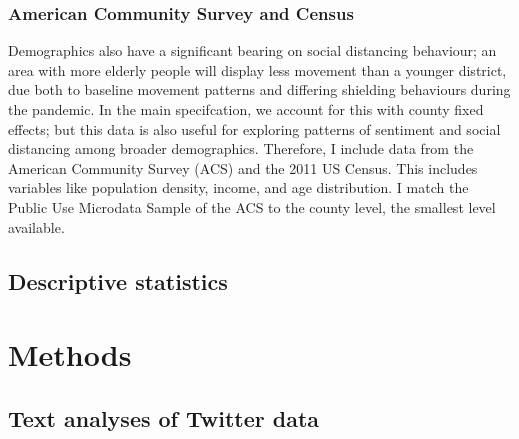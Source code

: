 \documentclass{article}
\begin{document}
\subsubsection{American Community Survey and Census}
Demographics also have a significant bearing on social distancing behaviour; an area with more elderly people will display less movement than a younger district, due both to baseline movement patterns and differing shielding behaviours during the pandemic. In the main specifcation, we account for this with county fixed effects; but this data is also useful for exploring patterns of sentiment and social distancing among broader demographics. Therefore, I include data from the American Community Survey (ACS) and the 2011 US Census. This includes variables like population density, income, and age distribution. I match the Public Use Microdata Sample of the ACS to the county level, the smallest level available. 
\subsection{Descriptive statistics}

\section{Methods}
\subsection{Text analyses of Twitter data}\label{approach}
\end{document}
